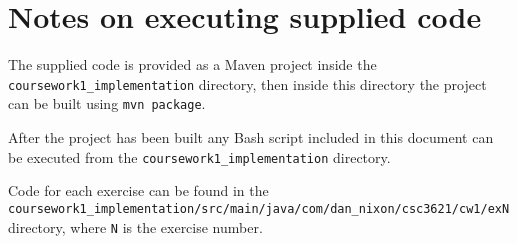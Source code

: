 \appendix
\section{Notes on executing supplied code}

The supplied code is provided as a Maven project inside the
\texttt{coursework1\_implementation} directory, then inside this directory the
project can be built using \texttt{mvn package}.

After the project has been built any Bash script included in this document can
be executed from the \texttt{coursework1\_implementation} directory.

Code for each exercise can be found in the\\
\texttt{coursework1\_implementation/src/main/java/com/dan\_nixon/csc3621/cw1/exN}
directory, where \texttt{N} is the exercise number.
